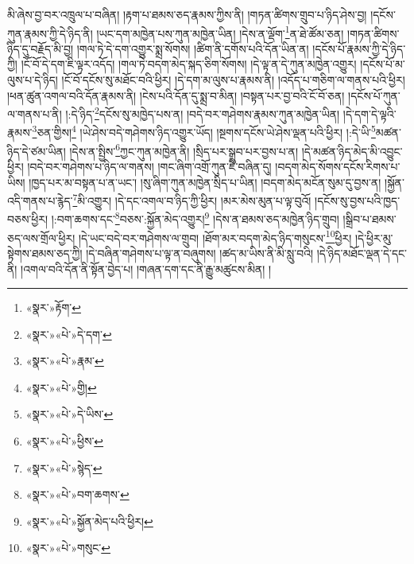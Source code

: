 མི་ཞེས་བྱ་བར་འཁྲུལ་པ་བཞིན། །རྟག་པ་ཐམས་ཅད་རྣམས་ཀྱིས་ནི། །གཏན་ཚིགས་གྲུབ་པ་ཉིད་ཤེས་བྱ། །དངོས་ཀུན་རྣམས་ཀྱི་དེ་ཉིད་ནི། །ཡང་དག་མཁྱེན་པས་ཀུན་མཁྱེན་ཡིན། །དེས་ན་ལྡོག་\footnote{«སྣར་»རྟོག་}ན་ཐེ་ཚོམ་ཅན། །གཏན་ཚིགས་ཉིད་དུ་བརྗོད་མི་བྱ། །གལ་ཏེ་དེ་དག་འགྱུར་སྨྲ་སོགས། །ཚིག་ནི་དགོས་པའི་དོན་ཡིན་ན། །དངོས་པོ་རྣམས་ཀྱི་དེ་ཉིད་ཀྱི། །ངོ་བོ་དེ་དག་ཇི་ལྟར་འདོད། །གལ་ཏེ་བདག་མེད་སྐད་ཅིག་སོགས། །དེ་ལྟ་ན་དེ་ཀུན་མཁྱེན་འགྱུར། །དངོས་པོ་མ་ལུས་པ་དེ་ཉིད། །ངོ་བོ་དངོས་སུ་མཐོང་བའི་ཕྱིར། །དེ་དག་མ་ལུས་པ་རྣམས་ནི། །འདོད་པ་གཅིག་ལ་གནས་པའི་ཕྱིར། །ཕན་ཚུན་འགལ་བའི་དོན་རྣམས་ནི། །ངེས་པའི་དོན་དུ་སྨྲ་བ་མིན། །བསྟན་པར་བྱ་བའི་ངོ་བོ་ཅན། །དངོས་པོ་ཀུན་ལ་གནས་པ་ནི། །:དེ་ཉིད་\footnote{«སྣར་»«པེ་»དེ་དག་}དངོས་སུ་མཁྱེད་པས་ན། །བདེ་བར་གཤེགས་རྣམས་ཀུན་མཁྱེན་ཡིན། །དེ་དག་དེ་ལྟའི་རྣམས་\footnote{«སྣར་»«པེ་»རྣམ་}ཅན་གྱིས།\footnote{«སྣར་»«པེ་»གྱི།} །ཡེ་ཤེས་བདེ་གཤེགས་ཉིད་འགྱུར་ཡོད། །སྔགས་དངོས་ཡེ་ཤེས་ལྡན་པའི་ཕྱིར། །:དེ་ཡི་\footnote{«སྣར་»«པེ་»དེ་ཡིས་}མཚན་ཉིད་དེ་ཙམ་ཡིན། །དེས་ན་སྤྱིས་\footnote{«སྣར་»«པེ་»ཕྱིས་}ཀྱང་ཀུན་མཁྱེན་ནི། །སྲིད་པར་སྒྲུབ་པར་བྱས་པ་ན། །དེ་མཚན་ཉིད་མེད་མི་འབྱུང་ཕྱིར། །བདེ་བར་གཤེགས་པ་ཉིད་ལ་གནས། །གང་ཞིག་འགྲོ་ཀུན་ཇི་བཞིན་དུ། །བདག་མེད་སོགས་དངོས་རིགས་པ་ཡིས། །ཁྱད་པར་མ་བསྟན་པ་ན་ཡང་། །སུ་ཞིག་ཀུན་མཁྱེན་སྲིད་པ་ཡིན། །བདག་མེད་མངོན་སུམ་དུ་བྱས་ན། །སྐྱོན་འདི་གནས་པ་རྙེད་\footnote{«སྣར་»«པེ་»སྙེད་}མི་འགྱུར། །དེ་དང་འགལ་བ་ཉིད་ཀྱི་ཕྱིར། །མར་མེས་མུན་པ་ལྟ་བུའོ། །དངོས་སུ་བྱས་པའི་ཁྱད་བཅས་ཕྱིར། །:བག་ཆགས་དང་\footnote{«སྣར་»«པེ་»བག་ཆགས་}བཅས་:སྐྱོན་མེད་འགྱུར།\footnote{«སྣར་»«པེ་»སྐྱོན་མེད་པའི་ཕྱིར།} །དེས་ན་ཐམས་ཅད་མཁྱེན་ཉིད་གྲུབ། །སྒྲིབ་པ་ཐམས་ཅད་ལས་གྲོལ་ཕྱིར། །དེ་ཡང་བདེ་བར་གཤེགས་ལ་གྲུབ། །ཐོག་མར་བདག་མེད་ཉིད་གསུངས་\footnote{«སྣར་»«པེ་»གསུང་}ཕྱིར། །དེ་ཕྱིར་མུ་སྟེགས་ཐམས་ཅད་ཀྱི། །དེ་བཞིན་གཤེགས་པ་ལྟ་ན་བཞུགས། །ཚད་མ་ཡིས་ནི་མི་སླུ་བའི། །དེ་ཉིད་མཐོང་ལྡན་དེ་དང་ནི། །འགལ་བའི་དོན་ནི་སྟོན་བྱེད་པ། །གཞན་དག་དང་ནི་རྒྱུ་མཚུངས་མིན། །
